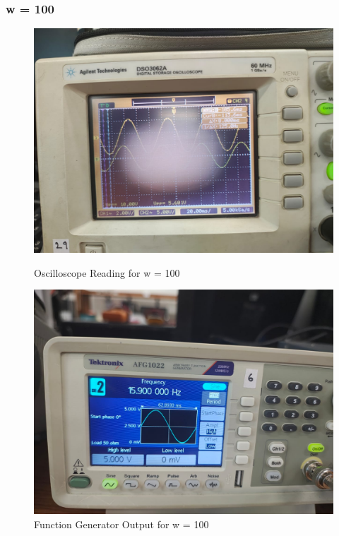 \documentclass[a4paper,12pt]{article}
\begin{document}
\subsubsection{w = 100}
\begin{figure}[H]
    \centering
    \begin{minipage}{0.48\textwidth}
        \centering
        \includegraphics[width=\textwidth]{fig/1w100o.jpeg} %
        \caption{Oscilloscope Reading for w = 100}
    \end{minipage}
    \hfill
    \begin{minipage}{0.48\textwidth}
        \centering
        \includegraphics[width=\textwidth]{fig/1w100.jpeg} %
        \caption{Function Generator Output for w = 100}
    \end{minipage}
\end{figure}
\end{document}
